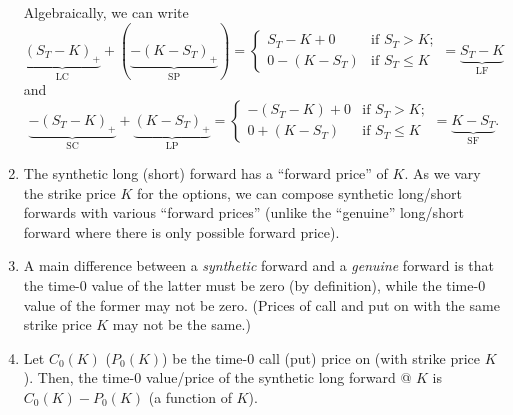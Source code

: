 \begin{enumerate}
\begin{note}
Algebraically, we can write
\[
\underbrace{(S_T-K)_{+}}_{\text{LC}}+(\underbrace{-(K-S_T)_{+}}_{\text{SP}})
=\begin{cases}
S_T-K+0&\text{if }S_T>K;\\
0-(K-S_T)&\text{if }S_T\le K
\end{cases}
=\underbrace{S_T-K}_{\text{LF}}
\]
and
\[
\underbrace{-(S_T-K)_{+}}_{\text{SC}}+\underbrace{(K-S_T)_{+}}_{\text{LP}}
=\begin{cases}
-(S_T-K)+0&\text{if }S_T>K;\\
0+(K-S_T)&\text{if }S_T\le K
\end{cases}
=\underbrace{K-S_T}_{\text{SF}}.
\]
\end{note}
\item The synthetic long (short) forward has a ``forward price'' of \(K\).  As
we vary the strike price \(K\) for the options, we can compose synthetic
long/short forwards with various ``forward prices'' (unlike the ``genuine''
long/short forward where there is only possible forward price).

\item A main difference between a \emph{synthetic} forward and a \emph{genuine}
forward is that the time-0 value of the latter must be zero (by definition),
while the time-0 value of the former may not be zero. (Prices of call and put
on  with the same strike price \(K\) may not be the same.)

\item Let \(C_0(K)\) (\(P_0(K)\)) be the time-0 call (put) price on
 (with strike price \(K\)). Then, the time-0 value/price of
the synthetic long forward @ \(K\) is \(C_0(K)-P_0(K)\) (a function of \(K\)).


\end{enumerate}
